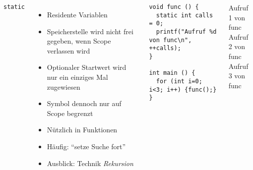\begin{frame}[fragile]
%
\begin{columns}[T]
\begin{Large}
{\texttt{static}}
\vspace{6pt}
\end{Large}
%
\begin{itemize}
\item Residente Variablen
\item Speicherstelle wird nicht frei gegeben, wenn Scope verlassen wird
\item Optionaler Startwert wird nur ein einziges Mal zugewiesen
\item Symbol dennoch nur auf Scope begrenzt
\item Nützlich in Funktionen
\item Häufig: \enquote{setze Suche fort}
\item Ausblick: Technik \emph{Rekursion}
\end{itemize}
%
\begin{codebox}
\begin{verbatim}
void func () {
  static int calls = 0;
  printf("Aufruf %d von func\n", ++calls);
}

int main () {
  for (int i=0; i<3; i++) {func();}
}
\end{verbatim}
\end{codebox}
%
\begin{cmdbox}[Ausgabe]
\scriptsize
Aufruf 1 von func\\
Aufruf 2 von func\\
Aufruf 3 von func
\end{cmdbox}
\end{columns}
%
\end{frame}


